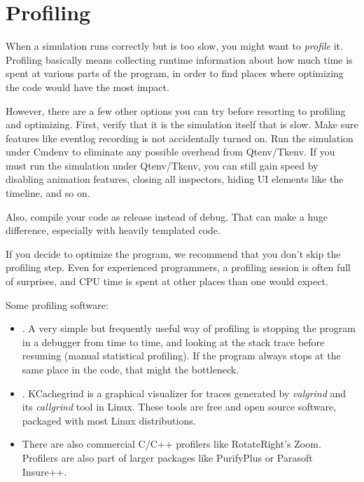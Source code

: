 \section{Profiling}
\label{sec:run-sim:profiling}

When a simulation runs correctly but is too slow, you might want to
\textit{profile} it. Profiling basically means collecting runtime
information about how much time is spent at various parts of the
program, in order to find places where optimizing the code would have 
the most impact.

However, there are a few other options you can try before resorting to profiling
and optimizing. First, verify that it  is the simulation itself that is slow.
Make sure features like eventlog recording is not accidentally turned on. Run
the simulation under Cmdenv to eliminate any possible overhead from Qtenv/Tkenv.
If you must run the simulation under Qtenv/Tkenv, you can still gain speed by
disabling animation features, closing all inspectors, hiding UI elements like
the timeline, and so on.

Also, compile your code as release instead of debug. That can make a huge
difference, especially with heavily templated code.

\begin{hint}
If you decide to optimize the program, we recommend that you don't skip the
profiling step. Even for experienced programmers, a profiling session is often
full of surprises, and CPU time is spent at other places than one would
expect.
\end{hint}

Some profiling software:

\begin{itemize}
  \item {}. A very simple but frequently useful way of profiling is
        stopping the program in a debugger from time to time, and looking at the
        stack trace before resuming (manual statistical profiling). If
        the program always stops at the same place in the code, that might the
        bottleneck.
  \item {}. KCachegrind is a graphical visualizer
        for traces generated by \textit{valgrind} and its \textit{callgrind}
        tool in Linux. These tools are free and open source software,
        packaged with most Linux distributions. 
  \item There are also commercial C/C++ profilers like RotateRight's Zoom.
        Profilers are also part of larger packages like PurifyPlus or
        Parasoft Insure++.
\end{itemize}


